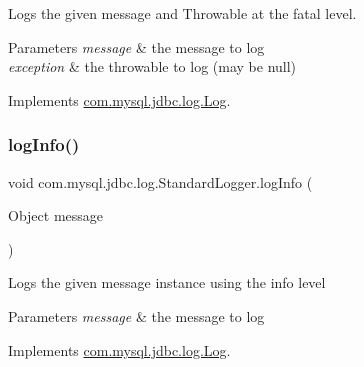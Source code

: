 Logs the given message and Throwable at the \textquotesingle{}fatal\textquotesingle{} level.


\begin{DoxyParams}{Parameters}
{\em message} & the message to log \\
\hline
{\em exception} & the throwable to log (may be null) \\
\hline
\end{DoxyParams}


Implements \mbox{\hyperlink{interfacecom_1_1mysql_1_1jdbc_1_1log_1_1_log_a6da5bf2be5d9c63cfd192ab457aaff92}{com.\+mysql.\+jdbc.\+log.\+Log}}.

\mbox{\label{classcom_1_1mysql_1_1jdbc_1_1log_1_1_standard_logger_ac3056a38def26fc68c472fd56c6cfcab}} 
\subsubsection{\texorpdfstring{log\+Info()}{logInfo()}\hspace{0.1cm}{\footnotesize\ttfamily [1/2]}}
{\footnotesize\ttfamily void com.\+mysql.\+jdbc.\+log.\+Standard\+Logger.\+log\+Info (\begin{DoxyParamCaption}\item[{Object}]{message }\end{DoxyParamCaption})}

Logs the given message instance using the \textquotesingle{}info\textquotesingle{} level


\begin{DoxyParams}{Parameters}
{\em message} & the message to log \\
\hline
\end{DoxyParams}


Implements \mbox{\hyperlink{interfacecom_1_1mysql_1_1jdbc_1_1log_1_1_log_a6a380b7638c3ebe1251d4e07cb7f4569}{com.\+mysql.\+jdbc.\+log.\+Log}}.

\mbox{\label{classcom_1_1mysql_1_1jdbc_1_1log_1_1_standard_logger_a4cfdd0fcd7f40b1dcd520c76a0b09235}} 
